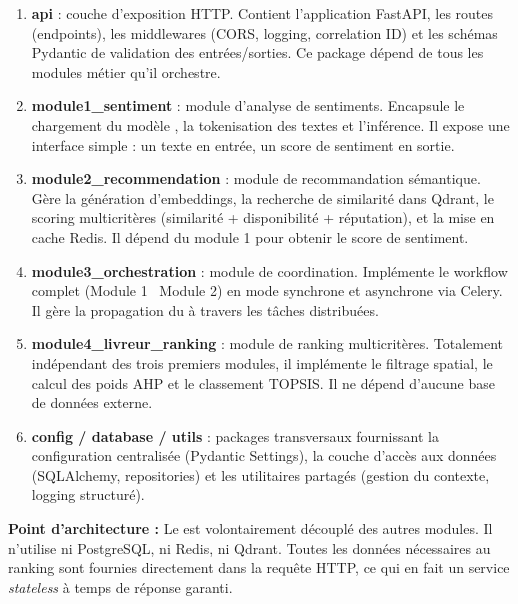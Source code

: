 \begin{enumerate}
    \item \textbf{api} : couche d'exposition HTTP. Contient l'application FastAPI, les routes (endpoints), les middlewares (CORS, logging, correlation ID) et les schémas Pydantic de validation des entrées/sorties. Ce package dépend de tous les modules métier qu'il orchestre.

    \item \textbf{module1\_sentiment} : module d'analyse de sentiments. Encapsule le chargement du modèle , la tokenisation des textes et l'inférence. Il expose une interface simple : un texte en entrée, un score de sentiment en sortie.

    \item \textbf{module2\_recommendation} : module de recommandation sémantique. Gère la génération d'embeddings, la recherche de similarité dans Qdrant, le scoring multicritères (similarité + disponibilité + réputation), et la mise en cache Redis. Il dépend du module 1 pour obtenir le score de sentiment.

    \item \textbf{module3\_orchestration} : module de coordination. Implémente le workflow complet (Module 1 \flowto\ Module 2) en mode synchrone et asynchrone via Celery. Il gère la propagation du  à travers les tâches distribuées.

    \item \textbf{module4\_livreur\_ranking} : module de ranking multicritères. Totalement indépendant des trois premiers modules, il implémente le filtrage spatial, le calcul des poids AHP et le classement TOPSIS. Il ne dépend d'aucune base de données externe.

    \item \textbf{config / database / utils} : packages transversaux fournissant la configuration centralisée (Pydantic Settings), la couche d'accès aux données (SQLAlchemy, repositories) et les utilitaires partagés (gestion du contexte, logging structuré).
\end{enumerate}

\begin{alertbox}
\textbf{Point d'architecture :} Le  est volontairement découplé des autres modules. Il n'utilise ni PostgreSQL, ni Redis, ni Qdrant. Toutes les données nécessaires au ranking sont fournies directement dans la requête HTTP, ce qui en fait un service \textit{stateless} à temps de réponse garanti.
\end{alertbox}

